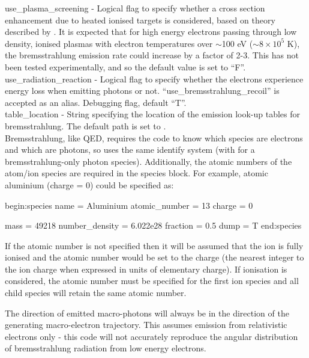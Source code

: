{\emphtext use\_plasma\_screening} - Logical flag to specify whether a cross
  section enhancement due to heated ionised targets is considered, based on
  theory described by \citet{Wu2018}. It is expected that for high energy
  electrons passing through low density, ionised plasmas with electron
  temperatures over $\sim$100 eV ($\sim8\times 10^{5}$ K), the bremsstrahlung
  emission rate could increase by a factor of 2-3. This has not been tested
  experimentally, and so the default value is set to ``F''.\\

{\emphtext use\_radiation\_reaction} - Logical flag to specify whether the
  electrons experience energy loss when emitting photons or not.
  ``use\_bremsstrahlung\_recoil'' is accepted as an alias. Debugging
  flag, default ``T''.\\

{\emphtext table\_location} - String specifying the
  location of the emission look-up tables for bremsstrahlung.
  The default path is set to
  .\\

Bremsstrahlung, like QED, requires the code to know which species are electrons
and which are photons, so uses the same identify system (with
 for a bremsstrahlung-only photon species).
Additionally, the atomic numbers of the atom/ion species are required in
the species block. For example, atomic aluminium (charge = 0) could be
specified as:

\begin{boxverbatim}
begin:species
   name = Aluminium
   atomic_number = 13
   charge = 0

   mass = 49218
   number_density = 6.022e28
   fraction = 0.5
   dump = T
end:species
\end{boxverbatim}

If the atomic number is not specified then it will be assumed that the ion is
fully ionised and the atomic number would be set to the charge (the nearest
integer to the ion charge when expressed in units of elementary charge). If
ionisation is considered, the atomic number must be specified for the first
ion species and all child species will retain the same atomic number.

The direction of emitted macro-photons will always be in the direction of the
generating macro-electron trajectory. This assumes emission from relativistic
electrons only - this code will not accurately reproduce the angular
distribution of bremsstrahlung radiation from low energy electrons.

